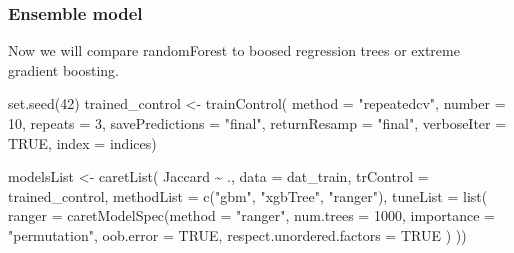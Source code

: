 \documentclass[
  letterpaper,
  DIV=11,
  numbers=noendperiod]{scrartcl}
\newenvironment{Shaded}{\begin{snugshade}}{\end{snugshade}}
\newcommand{\AttributeTok}[1]{\textcolor[rgb]{0.40,0.45,0.13}{#1}}
\newcommand{\ConstantTok}[1]{\textcolor[rgb]{0.56,0.35,0.01}{#1}}
\newcommand{\DecValTok}[1]{\textcolor[rgb]{0.68,0.00,0.00}{#1}}
\newcommand{\FunctionTok}[1]{\textcolor[rgb]{0.28,0.35,0.67}{#1}}
\newcommand{\NormalTok}[1]{\textcolor[rgb]{0.00,0.23,0.31}{#1}}
\newcommand{\OtherTok}[1]{\textcolor[rgb]{0.00,0.23,0.31}{#1}}
\newcommand{\SpecialCharTok}[1]{\textcolor[rgb]{0.37,0.37,0.37}{#1}}
\newcommand{\StringTok}[1]{\textcolor[rgb]{0.13,0.47,0.30}{#1}}
\begin{document}
\subsubsection{Ensemble model}\label{ensemble-model}

Now we will compare randomForest to boosed regression trees or extreme
gradient boosting.

\begin{Shaded}
\begin{Highlighting}[]
\FunctionTok{set.seed}\NormalTok{(}\DecValTok{42}\NormalTok{)}
\NormalTok{trained\_control }\OtherTok{\textless{}{-}} \FunctionTok{trainControl}\NormalTok{(}
    \AttributeTok{method =} \StringTok{"repeatedcv"}\NormalTok{,}
    \AttributeTok{number =} \DecValTok{10}\NormalTok{,}
    \AttributeTok{repeats =} \DecValTok{3}\NormalTok{,}
    \AttributeTok{savePredictions =} \StringTok{"final"}\NormalTok{,}
    \AttributeTok{returnResamp =} \StringTok{"final"}\NormalTok{,}
    \AttributeTok{verboseIter =} \ConstantTok{TRUE}\NormalTok{,}
    \AttributeTok{index =}\NormalTok{ indices)}

\NormalTok{modelsList }\OtherTok{\textless{}{-}} \FunctionTok{caretList}\NormalTok{(}
\NormalTok{    Jaccard }\SpecialCharTok{\textasciitilde{}}\NormalTok{ .,}
    \AttributeTok{data =}\NormalTok{ dat\_train,}
    \AttributeTok{trControl =}\NormalTok{ trained\_control,}
    \AttributeTok{methodList =} \FunctionTok{c}\NormalTok{(}\StringTok{"gbm"}\NormalTok{, }\StringTok{"xgbTree"}\NormalTok{, }\StringTok{"ranger"}\NormalTok{),}
    \AttributeTok{tuneList =} \FunctionTok{list}\NormalTok{(}
      \AttributeTok{ranger =} \FunctionTok{caretModelSpec}\NormalTok{(}\AttributeTok{method =} \StringTok{"ranger"}\NormalTok{, }\AttributeTok{num.trees =} \DecValTok{1000}\NormalTok{, }\AttributeTok{importance =} \StringTok{"permutation"}\NormalTok{, }\AttributeTok{oob.error =} \ConstantTok{TRUE}\NormalTok{, }\AttributeTok{respect.unordered.factors =} \ConstantTok{TRUE}\NormalTok{ )}
\NormalTok{    ))}
\end{Highlighting}
\end{Shaded}
\end{document}
